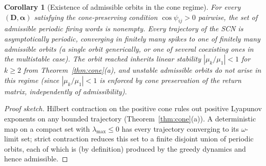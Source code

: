 \documentclass[12pt]{article}
\newcommand{\vv}[1]{\mathbf{#1}}
\newtheorem{corollary}{Corollary}
\begin{document}
\begin{corollary}[Existence of admissible orbits in the cone regime]\label{cor:cone-existence}
For every $(\vv{D},\boldsymbol{\alpha})$ satisfying the cone-preserving condition $\cos\psi_{ij}>0$ pairwise, the set of admissible periodic firing words is nonempty. Every trajectory of the SCN is asymptotically periodic, converging in finitely many spikes to one of finitely many admissible orbits (a single orbit generically, or one of several coexisting ones in the multistable case). The orbit reached inherits linear stability $|\mu_k/\mu_1|<1$ for $k\geq 2$ from Theorem~\ref{thm:cone}(a), and unstable admissible orbits do not arise in this regime (since $|\mu_k/\mu_1|<1$ is enforced by cone preservation of the return matrix, independently of admissibility).
\end{corollary}
\begin{proof}[Proof sketch]
Hilbert contraction on the positive cone rules out positive Lyapunov exponents on any bounded trajectory (Theorem~\ref{thm:cone}(a)). A deterministic map on a compact set with $\lambda_{\max}\leq 0$ has every trajectory converging to its $\omega$-limit set; strict contraction reduces this set to a finite disjoint union of periodic orbits, each of which is (by definition) produced by the greedy dynamics and hence admissible.
\end{proof}
\end{document}
